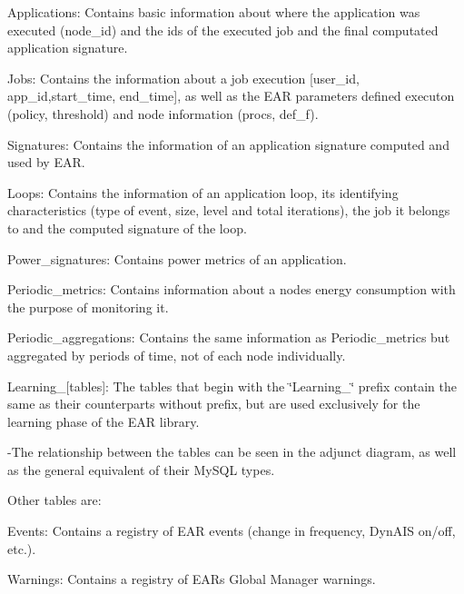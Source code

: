 \begin{DoxyItemize}
\item Applications\+: Contains basic information about where the application was executed (node\+\_\+id) and the id\textquotesingle{}s of the executed job and the final computated application signature.
\begin{DoxyItemize}
\item Jobs\+: Contains the information about a job execution \mbox{[}user\+\_\+id, app\+\_\+id,start\+\_\+time, end\+\_\+time\mbox{]}, as well as the E\+AR parameters defined executon (policy, threshold) and node information (procs, def\+\_\+f).
\item Signatures\+: Contains the information of an application signature computed and used by E\+AR.
\item Loops\+: Contains the information of an application loop, its identifying characteristics (type of event, size, level and total iterations), the job it belongs to and the computed signature of the loop.
\item Power\+\_\+signatures\+: Contains power metrics of an application.
\item Periodic\+\_\+metrics\+: Contains information about a node\textquotesingle{}s energy consumption with the purpose of monitoring it.
\item Periodic\+\_\+aggregations\+: Contains the same information as Periodic\+\_\+metrics but aggregated by periods of time, not of each node individually.
\item Learning\+\_\+\mbox{[}tables\mbox{]}\+: The tables that begin with the \char`\"{}\+Learning\+\_\+\char`\"{} prefix contain the same as their counterparts without prefix, but are used exclusively for the learning phase of the E\+AR library.
\end{DoxyItemize}
\end{DoxyItemize}

-\/\+The relationship between the tables can be seen in the adjunct diagram, as well as the general equivalent of their My\+S\+QL types.

Other tables are\+:
\begin{DoxyItemize}
\item Events\+: Contains a registry of E\+AR events (change in frequency, Dyn\+A\+IS on/off, etc.).
\item Warnings\+: Contains a registry of E\+AR\textquotesingle{}s Global Manager warnings. 
\end{DoxyItemize}
